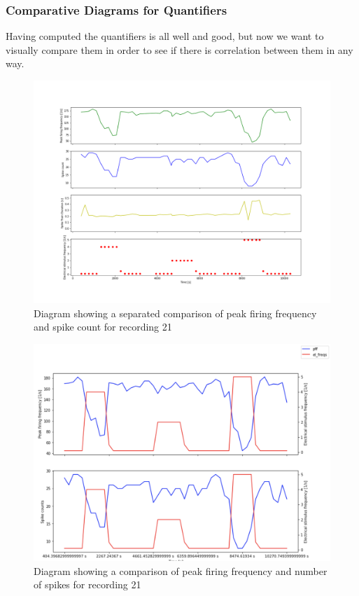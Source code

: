 \subsubsection{Comparative Diagrams for Quantifiers}
Having computed the quantifiers is all well and good, but now we want to visually compare them in order to see if there is correlation between them in any way.
\begin{figure}
	\includegraphics[width = \textwidth]{src/pic/11_12_13_sp}
	\caption{Diagram showing a separated comparison of peak firing frequency and spike count for recording 21}
	\label{fig:quantcomp_sp}
\end{figure}
\begin{figure}
	\includegraphics[width = \textwidth]{src/pic/11_12_13_cm}
	\caption{Diagram showing a comparison of peak firing frequency and number of spikes for recording 21}
	\label{fig:quantcomp_cm}
\end{figure}

